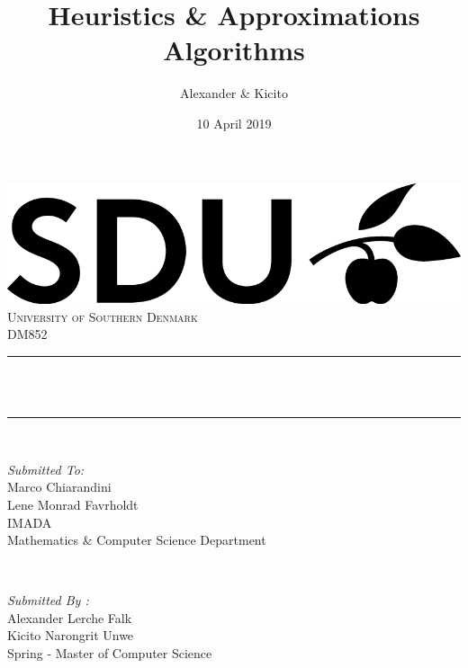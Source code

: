 \documentclass[12pt]{article}
\title{Heuristics \& Approximations Algorithms}								%
\author{Alexander \& Kicito}								%
\date{10 April 2019}											%
\makeatletter
\let\thetitle\@title
\makeatother
\begin{document}

\begin{titlepage}
	\centering
    \vspace*{0.5 cm}
    \includegraphics[scale = 0.75]{SDU_logo.png}\\[1.0 cm]	%
    \textsc{\LARGE University of Southern Denmark}\\[2.0 cm]	%
	\textsc{\Large DM852}\\[0.5 cm]				%
	\rule{\linewidth}{0.2 mm} \\[0.4 cm]
	{ \huge \bfseries \thetitle}\\
	\rule{\linewidth}{0.2 mm} \\[1.5 cm]
	
	\begin{minipage}{0.4\textwidth}
		\begin{flushleft} \large
			\emph{Submitted To:}\\
			Marco Chiarandini\\
            Lene Monrad Favrholdt \\
			IMADA \\
			Mathematics \& Computer Science Department \\
			\end{flushleft}
			\end{minipage}~
			\begin{minipage}{0.4\textwidth}
            
			\begin{flushright} \large
			\emph{Submitted By :} \\
			Alexander Lerche Falk\\
            Kicito Narongrit Unwe\\
            Spring - Master of Computer Science\\
		\end{flushright}
        
	\end{minipage}\\[2 cm]
	
	
    
    
    
    
	
\end{titlepage}
\end{document}
